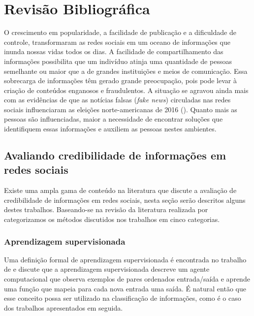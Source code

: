 \chapter{Revisão Bibliográfica}

O crescimento em popularidade, a facilidade de publicação e a dificuldade de controle, transformaram as redes sociais em um oceano de informações que inunda nossas vidas todos os dias. A facilidade de compartilhamento das informações possibilita que um indivíduo atinja uma quantidade de pessoas semelhante ou maior que a de grandes instituições e meios de comunicação. Essa sobrecarga de informações têm gerado grande preocupação, pois pode levar à criação de conteúdos enganosos e fraudulentos. A situação se agravou ainda mais com as evidências de que as notícias falsas (\emph{fake news}) circuladas nas redes sociais influenciaram as eleições norte-americanas de 2016 (\cite{allcott_social_2017}). Quanto mais as pessoas são influenciadas, maior a necessidade de encontrar soluções que identifiquem essas informações e auxiliem as pessoas nestes ambientes.

\section{Avaliando credibilidade de informações em redes sociais}

Existe uma ampla gama de conteúdo na literatura que discute a avaliação de credibilidade de informações em redes sociais, nesta seção serão descritos alguns destes trabalhos. Baseando-se na revisão da literatura realizada por \cite{almansour_evaluation_2014} categorizamos os métodos discutidos nos trabalhos em cinco categorias.

\subsection{Aprendizagem supervisionada}

Uma definição formal de aprendizagem supervisionada é encontrada no trabalho de \cite{russell_artificial_2010} e discute que a aprendizagem supervisionada descreve um agente computacional que observa exemplos de pares ordenados entrada/saída e aprende uma função que mapeia para cada nova entrada uma saída. É natural então que esse conceito possa ser utilizado na classificação de informações, como é o caso dos trabalhos apresentados em seguida.


